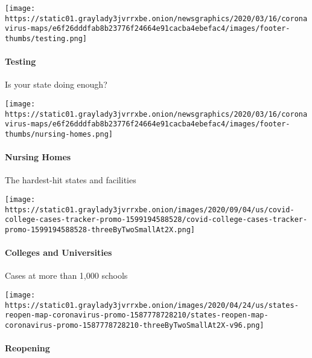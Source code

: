 \texttt{[image: https://static01.graylady3jvrrxbe.onion/newsgraphics/2020/03/16/coronavirus-maps/e6f26dddfab8b23776f24664e91cacba4ebefac4/images/footer-thumbs/testing.png]}

\hypertarget{testing}{%
\paragraph{Testing}\label{testing}}

Is your state doing enough?

\href{https://www.nytimes3xbfgragh.onion/interactive/2020/us/coronavirus-nursing-homes.html}{}

\texttt{[image: https://static01.graylady3jvrrxbe.onion/newsgraphics/2020/03/16/coronavirus-maps/e6f26dddfab8b23776f24664e91cacba4ebefac4/images/footer-thumbs/nursing-homes.png]}

\hypertarget{nursing-homes}{%
\paragraph{Nursing Homes}\label{nursing-homes}}

The hardest-hit states and facilities

\href{https://www.nytimes3xbfgragh.onion/interactive/2020/us/covid-college-cases-tracker.html}{}

\texttt{[image: https://static01.graylady3jvrrxbe.onion/images/2020/09/04/us/covid-college-cases-tracker-promo-1599194588528/covid-college-cases-tracker-promo-1599194588528-threeByTwoSmallAt2X.png]}

\hypertarget{colleges-and-universities}{%
\paragraph{Colleges and Universities}\label{colleges-and-universities}}

Cases at more than 1,000 schools

\href{https://www.nytimes3xbfgragh.onion/interactive/2020/us/states-reopen-map-coronavirus.html}{}

\texttt{[image: https://static01.graylady3jvrrxbe.onion/images/2020/04/24/us/states-reopen-map-coronavirus-promo-1587778728210/states-reopen-map-coronavirus-promo-1587778728210-threeByTwoSmallAt2X-v96.png]}

\hypertarget{reopening}{%
\paragraph{Reopening}\label{reopening}}

